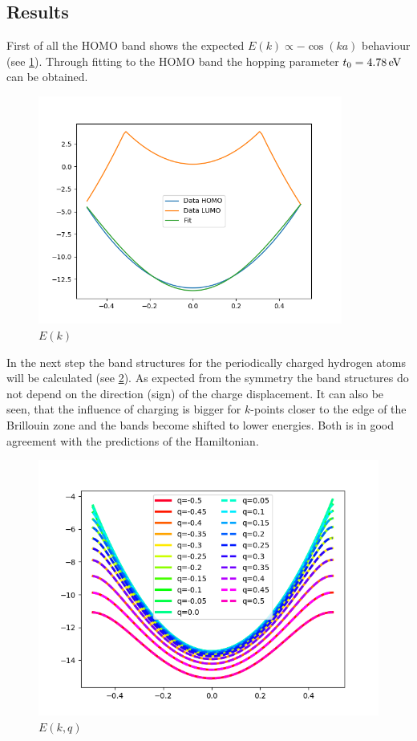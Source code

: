 \subsection{Results}

First of all the HOMO band shows the expected $E(k)\propto -\cos(ka)$ behaviour (see \cref{image_hydrogen_bandstructure}). Through fitting to the HOMO band the hopping parameter $t_0 = \unit[4.78]{eV}$ can be obtained.

\begin{figure}[!bth]
	\centering
	\includegraphics[width = 10cm]{Images/Hydrogen/hydrogen_bandstructure}
	\caption{$E(k)$}
	\label{image_hydrogen_bandstructure}
\end{figure}

In the next step the band structures for the periodically charged hydrogen atoms will be calculated (see \cref{image_hydrogen_charged_bands}). As expected from the symmetry the band structures do not depend on the direction (sign) of the charge displacement. It can also be seen, that the influence of charging is bigger for $k$-points closer to the edge of the Brillouin zone and the bands become shifted to lower energies. Both is in good agreement with the predictions of the Hamiltonian.

\begin{figure}
	\centering
	\includegraphics[width = 12cm]{Images/Hydrogen/hydrogen_charged_bands}
	\caption{$E(k, q)$}
	\label{image_hydrogen_charged_bands}
\end{figure}




